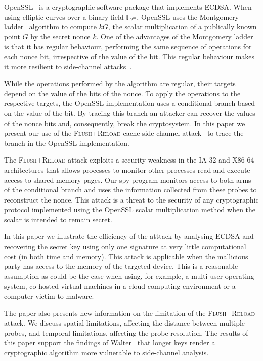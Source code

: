 \documentclass[twocolumn]{svjour3}
\begin{document}
OpenSSL~\cite{openssl} is a cryptographic software package that implements ECDSA.
When using elliptic curves over a binary field $\mathbb{F}_{2^m}$, OpenSSL uses the 
Montgomery ladder~\cite{montgomery87speeding,joye03montgomery} algorithm to compute $kG$, the scalar multiplication of a publically known point $G$ by the secret nonce $k$.
One of the advantages of the Montgomery ladder is that it has regular behaviour, performing
the same sequence of operations for each nonce bit, irrespective of the value of the bit.
This regular behaviour makes it more resilient to side-channel attacks~\cite{joye03montgomery,okeya00elliptic}.

While the operations performed by the algorithm are regular, their targets depend on the value of the bits of the nonce.
To apply the operations to the respective targets, the OpenSSL implementation uses a conditional branch based on the value of the bit. By tracing this branch an attacker can recover the values of the nonce bits and, consequently, break the cryptosystem. In this paper we present our use of the \textsc{Flush+Reload} cache side-channel attack~\cite{yarom13flush} to trace the branch in the OpenSSL implementation.

The \textsc{Flush+Reload} attack exploits a security weakness in the IA-32 and X86-64 architectures that allows processes
to monitor other processes read and execute access to shared memory pages.
Our spy program monitors access to both arms of the conditional branch and uses the information
collected from these probes to reconstruct the nonce. This attack is a threat to the security of any cryptographic protocol implemented using the OpenSSL scalar multiplication method when the scalar is intended to remain secret.

In this paper we illustrate the efficiency of the atttack by analysing ECDSA and recovering the secret key using only one signature at very little computational cost (in both time and memory). This attack is applicable when the mallicious party has access to the memory of the targeted device.
This is  a reasonable assumption as could be the case when using, for example, a multi-user operating system, co-hosted virtual machines in a cloud computing environment or a computer victim to malware. 

The paper also presents new information on the limitation of the \textsc{Flush+Reload} attack.
We discuss spatial limitations, affecting the distance between multiple probes, and 
temporal limitations, affecting the probe resolution.
The results of this paper support the findings of Walter~\cite{walter04longer} that longer keys render a cryptographic algorithm more vulnerable to side-channel analysis.
\end{document}

